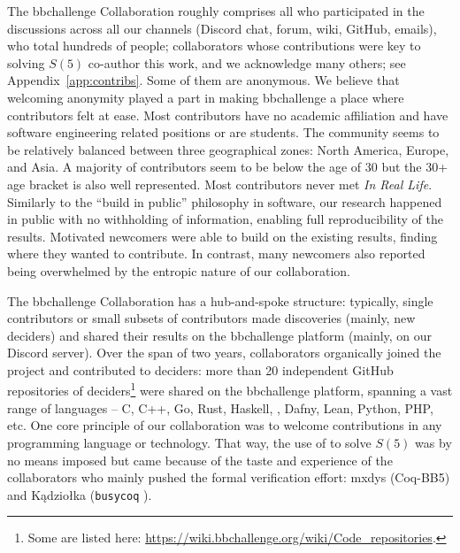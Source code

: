 \documentclass[a4paper,british]{article}
\theoremstyle{definition} %
\numberwithin{equation}{section}
\theoremstyle{definition} %
\newcommand{\CoqBB}{Coq-BB5\xspace}
\begin{document}
The bbchallenge Collaboration roughly comprises all who participated in the discussions across all our channels (Discord chat, forum, wiki, GitHub, emails), who total hundreds of people; collaborators whose contributions were key to solving $S(5)$ co-author this work, and we acknowledge many others; see Appendix~\ref{app:contribs}.  Some of them are anonymous. We believe that welcoming anonymity played a part in making bbchallenge a place where contributors felt at ease. Most contributors have no academic affiliation and have software engineering related positions or are students. The community seems to be relatively balanced between three geographical zones: North America, Europe, and Asia. A majority of contributors seem to be below the age of 30 but the 30+ age bracket is also well represented. Most contributors never met \textit{In Real Life}. Similarly to the ``build in public'' philosophy in software, our research happened in public with no withholding of information, enabling full reproducibility of the results. Motivated newcomers were able to build on the existing results, finding where they wanted to contribute. In contrast, many newcomers also reported being overwhelmed by the entropic nature of our collaboration.


The bbchallenge Collaboration has a hub-and-spoke structure: typically, single contributors or small subsets of contributors made discoveries (mainly, new deciders) and shared their results on the bbchallenge platform (mainly, on our Discord server). Over the span of two years, collaborators organically joined the project and contributed to deciders: more than 20 independent GitHub repositories of deciders\footnote{Some are listed here: \url{https://wiki.bbchallenge.org/wiki/Code_repositories}.} were shared on the bbchallenge platform, spanning a vast range of languages -- C, C++, Go, Rust, Haskell, \Coq, Dafny, Lean, Python, PHP, etc. One core principle of our collaboration was to welcome contributions in any programming language or technology. That way, the use of \Coq to solve $S(5)$ was by no means imposed but came because of the taste and experience of the collaborators who mainly pushed the formal verification effort: mxdys (\CoqBB) and Kądziołka (\texttt{busycoq} \cite{busycoq}).
\end{document}
